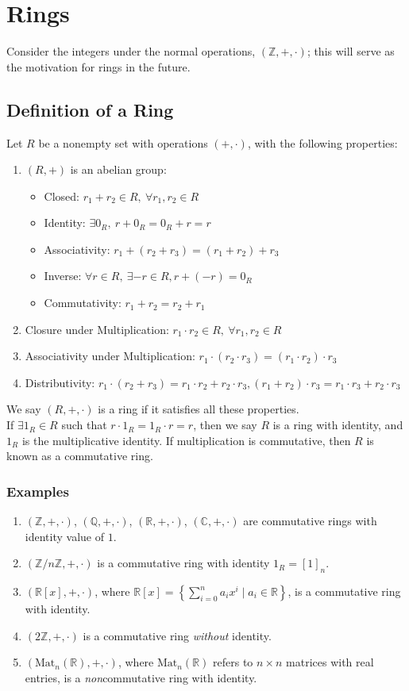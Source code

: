 \documentclass[10pt]{extarticle}
\newcommand{\Q}{\mathbb{Q}}
\newcommand{\Z}{\mathbb{Z}}
\newcommand{\R}{\mathbb{R}}
\begin{document}
  \section{Rings}%
  Consider the integers under the normal operations, $(\Z,+,\cdot)$; this will serve as the motivation for rings in the future.
  \subsection{Definition of a Ring}%
   Let $R$ be a nonempty set with operations $(+,\cdot)$, with the following properties:
    \begin{enumerate}[(1)]
      \item $(R,+)$ is an abelian group:
        \begin{itemize}
          \item Closed: $r_1 + r_2\in R,~ \forall r_1,r_2\in R$
          \item Identity: $\exists 0_R,~r + 0_R = 0_R+r = r$
          \item Associativity: $r_1 + (r_2 + r_3) = (r_1 + r_2) + r_3$
          \item Inverse: $\forall r\in R,~\exists -r\in R, r + (-r) = 0_R$
          \item Commutativity: $r_1 + r_2 = r_2 + r_1$
        \end{itemize}
      \item Closure under Multiplication: $r_1\cdot r_2\in R,~\forall r_1,r_2\in R$
      \item Associativity under Multiplication: $r_1\cdot (r_2 \cdot r_3) = (r_1\cdot r_2)\cdot r_3$
      \item Distributivity: $r_1\cdot (r_2 + r_3) = r_1\cdot r_2 + r_2\cdot r_3, (r_1 + r_2)\cdot r_3 = r_1\cdot r_3 + r_2\cdot r_3$
    \end{enumerate}
  We say $(R,+,\cdot)$ is a ring if it satisfies all these properties.\\

  If $\exists 1_R\in R$ such that $r\cdot 1_R = 1_R \cdot r = r$, then we say $R$ is a ring with identity, and $1_R$ is the multiplicative identity. If multiplication is commutative, then $R$ is known as a commutative ring.
  \subsubsection{Examples}%
  \begin{enumerate}[(1)]
    \item $(\Z,+,\cdot)$, $(\Q,+,\cdot)$, $(\R,+,\cdot)$, $(\mathbb{C},+,\cdot)$ are commutative rings with identity value of $1$.
    \item $(\Z/n\Z,+,\cdot)$ is a commutative ring with identity $1_{R} = [1]_n$.
    \item $(\R[x],+,\cdot)$, where $\displaystyle\R[x] = \left\{\sum_{i=0}^{n}a_ix^i\mid a_i\in\R\right\}$, is a commutative ring with identity.
    \item $(2\Z,+,\cdot)$ is a commutative ring \textit{without} identity.
    \item $(\text{Mat}_{n}(\R),+,\cdot)$, where $\text{Mat}_n(\R)$ refers to $n\times n$ matrices with real entries, is a \textit{non}commutative ring with identity.
  \end{enumerate}
\end{document}
